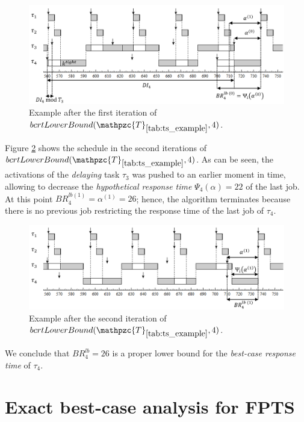 \documentclass[fleqn]{article}
\begin{document}
\begin{figure}[H]
	\centering
	\includegraphics[width=1\linewidth]{figures/bcrt_lb_ex1.PNG}
	\caption{Example after the first iteration of $bcrtLowerBound(\mathpzc{T}_{\ref{tab:ts_example}},4)$. }
	\label{fig:bcrt_lb_ex1}
\end{figure}

Figure \ref{fig:bcrt_lb_ex2} shows the schedule in the second iterations of $bcrtLowerBound(\mathpzc{T}_{\ref{tab:ts_example}},4)$. As can be seen, the activations of the \textit{delaying} task $\tau_3$ was pushed to an earlier moment in time, allowing to decrease the \textit{hypothetical response time} $\Psi_4(\alpha)=22$ of the last job. At this point $BR^{lb(1)}_4 = \alpha^{(1)} = 26$; hence, the algorithm terminates because there is no previous job restricting the response time of the last job of $\tau_4$.

\begin{figure}[H]
	\centering
	\includegraphics[width=1\linewidth]{figures/bcrt_lb_ex2.PNG}
	\caption{Example after the second iteration of $bcrtLowerBound(\mathpzc{T}_{\ref{tab:ts_example}},4)$. }
	\label{fig:bcrt_lb_ex2}
\end{figure}

We conclude that $BR^{lb}_4 = 26$ is a proper lower bound for the \textit{best-case response time} of $\tau_4$.


\section{Exact best-case analysis for FPTS}
\end{document}
